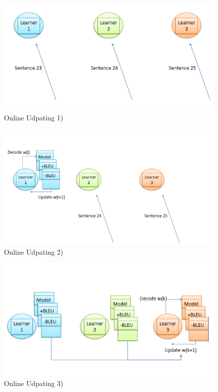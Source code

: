 \begin{figure}[h]
	\centering
		\includegraphics[scale=0.5]{training_img_files/update1.PNG}
	\caption{Online Udpating 1)}
	\label{fig:update1}
\end{figure}


\begin{figure}[h]
	\centering
		\includegraphics[scale=0.5]{training_img_files/update2.PNG}
	\caption{Online Udpating 2)}
	\label{fig:update2}
\end{figure}


\begin{figure}[h]
	\centering
		\includegraphics[scale=0.5]{training_img_files/update3.PNG}
	\caption{Online Udpating 3)}
	\label{fig:update3}
\end{figure}

